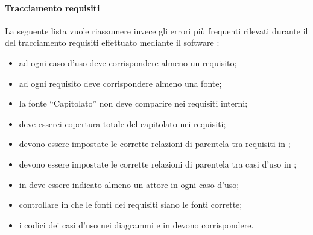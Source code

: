 \documentclass[12pt,a4paper]{article}
\begin{document}
\paragraph{Tracciamento requisiti}
La seguente lista vuole riassumere invece gli  errori più frequenti rilevati durante il  del tracciamento requisiti effettuato mediante il software :
\begin{itemize}
	\item ad ogni caso d’uso deve corrispondere almeno un requisito;
	\item ad ogni requisito deve corrispondere almeno una fonte; 
	\item la fonte “Capitolato” non deve comparire nei requisiti interni; 
	\item deve esserci copertura totale del capitolato nei requisiti;
	\item devono essere impostate le corrette relazioni di parentela tra requisiti in ; 
	\item devono essere impostate le corrette relazioni di parentela tra casi d’uso in ; 
	\item in  deve essere indicato almeno un attore in ogni caso d’uso;
	\item controllare in  che le fonti dei requisiti siano le fonti corrette; 
	\item i codici dei casi d’uso nei diagrammi e in  devono corrispondere.
\end{itemize}


\newpage
\printglossary[title={Glossario}]
\end{document}
